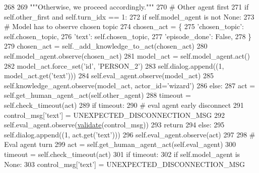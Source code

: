 \begin{DoxyCode}
268 
269         \textcolor{stringliteral}{"""Otherwise, we proceed accordingly."""}
270         \textcolor{comment}{# Other agent first}
271         \textcolor{keywordflow}{if} self.other\_first \textcolor{keywordflow}{and} self.turn\_idx == 1:
272             \textcolor{keywordflow}{if} self.model\_agent \textcolor{keywordflow}{is} \textcolor{keywordflow}{not} \textcolor{keywordtype}{None}:
273                 \textcolor{comment}{# Model has to observe chosen topic}
274                 chosen\_act = \{
275                     \textcolor{stringliteral}{'chosen\_topic'}: self.chosen\_topic,
276                     \textcolor{stringliteral}{'text'}: self.chosen\_topic,
277                     \textcolor{stringliteral}{'episode\_done'}: \textcolor{keyword}{False},
278                 \}
279                 chosen\_act = self.\_add\_knowledge\_to\_act(chosen\_act)
280                 self.model\_agent.observe(chosen\_act)
281                 model\_act = self.model\_agent.act()
282                 model\_act.force\_set(\textcolor{stringliteral}{'id'}, \textcolor{stringliteral}{'PERSON\_2'})
283                 self.dialog.append((1, model\_act.get(\textcolor{stringliteral}{'text'})))
284                 self.eval\_agent.observe(model\_act)
285                 self.knowledge\_agent.observe(model\_act, actor\_id=\textcolor{stringliteral}{'wizard'})
286             \textcolor{keywordflow}{else}:
287                 act = self.get\_human\_agent\_act(self.other\_agent)
288                 timeout = self.check\_timeout(act)
289                 \textcolor{keywordflow}{if} timeout:
290                     \textcolor{comment}{# eval agent early disconnect}
291                     control\_msg[\textcolor{stringliteral}{'text'}] = UNEXPECTED\_DISCONNECTION\_MSG
292                     self.eval\_agent.observe(\hyperlink{namespaceparlai_1_1core_1_1worlds_afc3fad603b7bce41dbdc9cdc04a9c794}{validate}(control\_msg))
293                     \textcolor{keywordflow}{return}
294                 \textcolor{keywordflow}{else}:
295                     self.dialog.append((1, act.get(\textcolor{stringliteral}{'text'})))
296                     self.eval\_agent.observe(act)
297 
298         \textcolor{comment}{# Eval agent turn}
299         act = self.get\_human\_agent\_act(self.eval\_agent)
300         timeout = self.check\_timeout(act)
301         \textcolor{keywordflow}{if} timeout:
302             \textcolor{keywordflow}{if} self.model\_agent \textcolor{keywordflow}{is} \textcolor{keywordtype}{None}:
303                 control\_msg[\textcolor{stringliteral}{'text'}] = UNEXPECTED\_DISCONNECTION\_MSG

\end{DoxyCode}
